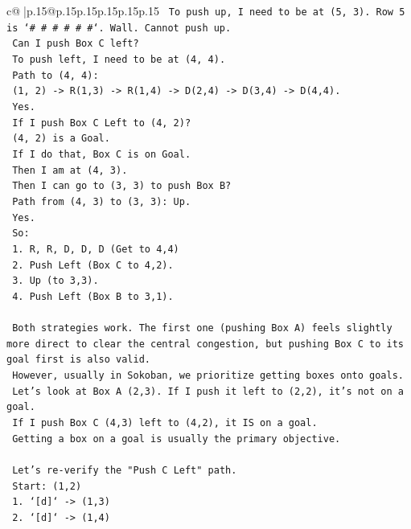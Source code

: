 \documentclass{article}
\begin{document}
{\begin{supertabular}{c@{$\;$}|p{.15\linewidth}@{}p{.15\linewidth}p{.15\linewidth}p{.15\linewidth}p{.15\linewidth}p{.15\linewidth}}
{{{\texttt{    To push up, I need to be at (5, 3). Row 5 is `\# \# \# \# \# \#`. Wall. Cannot push up.} \\
\texttt{    Can I push Box C left?} \\
\texttt{    To push left, I need to be at (4, 4).} \\
\texttt{    Path to (4, 4):} \\
\texttt{    (1, 2) {-}> R(1,3) {-}> R(1,4) {-}> D(2,4) {-}> D(3,4) {-}> D(4,4).} \\
\texttt{    Yes.} \\
\texttt{    If I push Box C Left to (4, 2)?} \\
\texttt{    (4, 2) is a Goal.} \\
\texttt{    If I do that, Box C is on Goal.} \\
\texttt{    Then I am at (4, 3).} \\
\texttt{    Then I can go to (3, 3) to push Box B?} \\
\texttt{    Path from (4, 3) to (3, 3): Up.} \\
\texttt{    Yes.} \\
\texttt{    So:} \\
\texttt{    1. R, R, D, D, D (Get to 4,4)} \\
\texttt{    2. Push Left (Box C to 4,2).} \\
\texttt{    3. Up (to 3,3).} \\
\texttt{    4. Push Left (Box B to 3,1).} \\
\\ 
\texttt{    Both strategies work. The first one (pushing Box A) feels slightly more direct to clear the central congestion, but pushing Box C to its goal first is also valid.} \\
\texttt{    However, usually in Sokoban, we prioritize getting boxes onto goals.} \\
\texttt{    Let's look at Box A (2,3). If I push it left to (2,2), it's not on a goal.} \\
\texttt{    If I push Box C (4,3) left to (4,2), it IS on a goal.} \\
\texttt{    Getting a box on a goal is usually the primary objective.} \\
\\ 
\texttt{    Let's re{-}verify the "Push C Left" path.} \\
\texttt{    Start: (1,2)} \\
\texttt{    1. `{[}d{]}` {-}> (1,3)} \\
\texttt{    2. `{[}d{]}` {-}> (1,4)} \\
}}}
\end{supertabular}}
\end{document}
